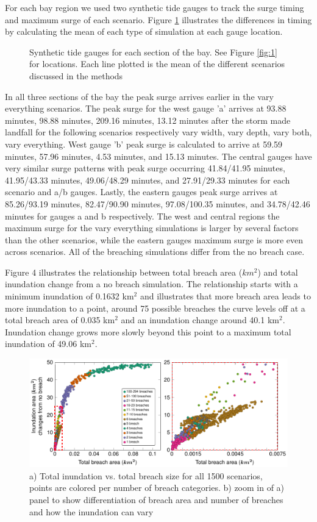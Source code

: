 \documentclass{coastal_paper}
\begin{document}
For each bay region we used two synthetic tide gauges to track the surge timing and maximum surge of each scenario. Figure \ref{fig:4} illustrates the differences in timing by calculating the mean of each type of simulation at each gauge location.
\begin{figure}[ht]
    \centering
    \resizebox{\textwidth}{!}{%
            
        }
    \caption{Synthetic tide gauges for each section of the bay. See Figure \ref{fig:1} for locations. Each line plotted is the mean of the different scenarios discussed in the methods}
    \label{fig:4}
\end{figure}
In all three sections of the bay the peak surge arrives earlier in the vary everything scenarios. The peak surge for the west gauge 'a' arrives at  93.88 minutes, 98.88 minutes, 209.16 minutes, 13.12 minutes after the storm made landfall for the following scenarios respectively vary width, vary depth, vary both, vary everything. West gauge 'b' peak surge is calculated to arrive at 59.59 minutes, 57.96 minutes, 4.53 minutes, and 15.13 minutes. The central gauges have very similar surge patterns with peak surge occurring 41.84/41.95 minutes, 41.95/43.33 minutes, 49.06/48.29 minutes, and 27.91/29.33 minutes for each scenario and a/b gauges. Lastly, the eastern gauges peak surge arrives at 85.26/93.19 minutes, 82.47/90.90 minutes, 97.08/100.35 minutes, and 34.78/42.46 minutes for gauges a and b respectively. The west and central regions the maximum surge for the vary everything simulations is larger by several factors than the other scenarios, while the eastern gauges maximum surge is more even across scenarios. All of the breaching simulations differ from the no breach case.

Figure 4 illustrates the relationship between total breach area ($km^2$) and total inundation change from a no breach simulation. The relationship starts with a minimum inundation of 0.1632 km$^2$ and illustrates that more breach area leads to more inundation to a point, around 75 possible breaches the curve levels off at a total breach area of 0.035 km$^2$ and an inundation change around 40.1 km$^2$. Inundation change grows more slowly beyond this point to a maximum total inundation of 49.06 km$^2$.

\begin{figure}[ht]
    \centering
    \includegraphics[width=\textwidth]{figures/fig5_v2.pdf}
    \caption{a) Total inundation vs. total breach size for all 1500 scenarios, points are colored per number of breach categories. b) zoom in of a) panel to show differentiation of breach area and number of breaches and how the inundation can vary}
    \label{fig:5}
\end{figure}
\end{document}
